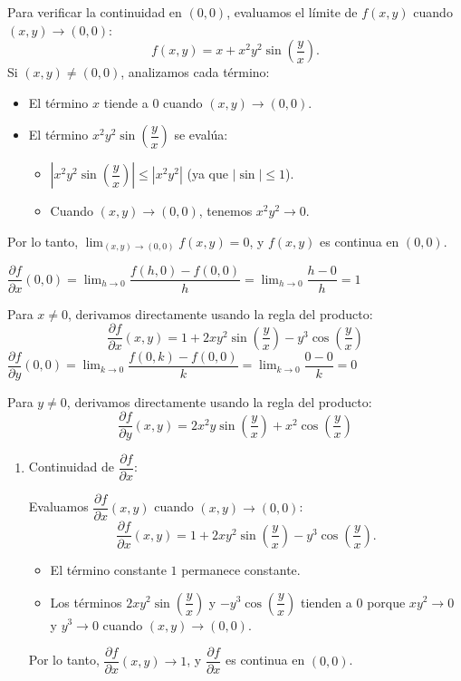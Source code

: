 \begin{enumerate}[label=\color{red}\textbf{\arabic*)}, leftmargin=*]
Para verificar la continuidad en $(0,0)$, evaluamos el límite de $f(x,y)$ cuando $(x,y)\to(0,0)$: 
$$
f(x,y)=x+x^2y^2\sin\left(\dfrac{y}{x}\right).
$$
Si $(x,y)\neq(0,0)$, analizamos cada término:
\begin{itemize}
\item El término $x$ tiende a $0$ cuando $(x,y)\to(0,0)$.
\item El término $x^2y^2\sin\left(\dfrac{y}{x}\right)$ se evalúa:
\begin{itemize}
\item $\left| x^{2}y^{2}\sin \left( \dfrac{y}{x} \right) \right|\leq|x^{2}y^{2}|$ (ya que $|\sin|\le1$).
\item Cuando $(x,y)\to(0,0)$, tenemos $x^2y^2\to0$.
\end{itemize}
\end{itemize}
Por lo tanto, $\lim_{(x,y)\to(0,0)}f(x,y)=0$, y $f(x,y)$ es continua en $(0,0)$.

 $\dfrac{\partial f}{\partial x}(0,0)=\lim_{ h \to 0 }\dfrac{f(h,0)-f(0,0)}{h}=\lim_{ h \to 0 }\dfrac{h-0}{h}=1$

Para $x\neq 0$, derivamos directamente usando la regla del producto:
$$
\dfrac{ \partial f }{ \partial x } (x,y)=1+2xy^{2}\sin \left( \dfrac{y}{x} \right)-y^{3}\cos \left( \dfrac{y}{x} \right)
$$
$\dfrac{ \partial f }{ \partial y }(0,0)=\lim_{ k \to 0 }\dfrac{f(0,k)-f(0,0)}{k}=\lim_{ k \to 0 }\dfrac{0-0}{k}=0$

Para $y\neq 0$, derivamos directamente usando la regla del producto:
$$
\dfrac{ \partial f }{ \partial y } (x,y)=2x^{2}y\sin \left( \dfrac{y}{x} \right)+x^{2}\cos \left( \dfrac{y}{x} \right)
$$

\begin{enumerate}[label=\arabic*)]
\item Continuidad de $\dfrac{\partial f}{\partial x}$:

Evaluamos $\dfrac{\partial f}{\partial x}(x,y)$ cuando $(x,y)\to(0,0)$: $$\dfrac{\partial f}{\partial x}(x,y)=1+2xy^2\sin\left(\dfrac{y}{x}\right)-y^3\cos\left(\dfrac{y}{x}\right).$$
\begin{itemize}
\item El término constante $1$ permanece constante.
\item Los términos $2xy^2\sin\left(\dfrac{y}{x}\right)$ y $-y^3\cos\left(\dfrac{y}{x}\right)$ tienden a $0$ porque $xy^2\to0$ y $y^3\to0$ cuando $(x,y)\to(0,0)$.
\end{itemize}
Por lo tanto, $\dfrac{\partial f}{\partial x}(x,y)\to1$, y $\dfrac{\partial f}{\partial x}$ es continua en $(0,0)$.


\end{enumerate}
\end{enumerate}
